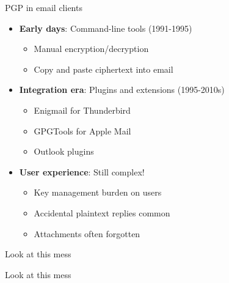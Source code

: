 \documentclass[aspectratio=169, lualatex, handout]{beamer}
\begin{document}
\begin{frame}{PGP in email clients}
	\begin{itemize}
		\item \textbf{Early days}: Command-line tools (1991-1995)
		      \begin{itemize}
			      \item Manual encryption/decryption
			      \item Copy and paste ciphertext into email
		      \end{itemize}
		\item \textbf{Integration era}: Plugins and extensions (1995-2010s)
		      \begin{itemize}
			      \item Enigmail for Thunderbird
			      \item GPGTools for Apple Mail
			      \item Outlook plugins
		      \end{itemize}
		\item \textbf{User experience}: Still complex!
		      \begin{itemize}
			      \item Key management burden on users
			      \item Accidental plaintext replies common
			      \item Attachments often forgotten
		      \end{itemize}
	\end{itemize}
\end{frame}

\begin{frame}{Look at this mess}
\end{frame}

\begin{frame}{Look at this mess}
\end{frame}
\end{document}
